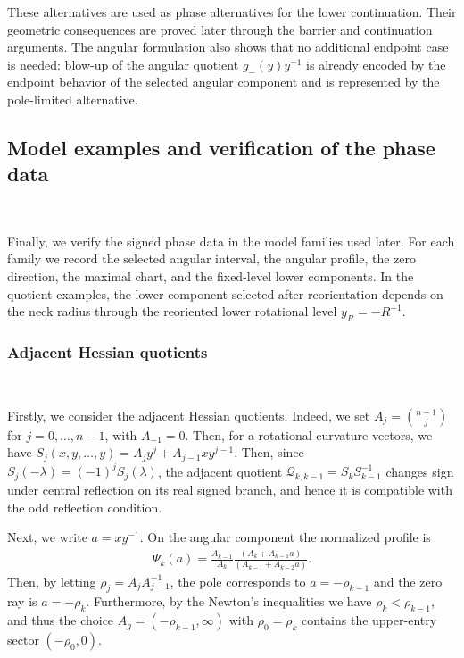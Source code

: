 \documentclass{amsart}
\theoremstyle{plain}
\theoremstyle{mainintrothm}
\theoremstyle{definition}
\begin{document}
	These alternatives are used as phase alternatives for the lower continuation.
	Their geometric consequences are proved later through the barrier and
	continuation arguments.  The angular formulation also shows that no additional
	endpoint case is needed: blow-up of the angular quotient
	$g_-(y)y^{-1}$ is already encoded by the endpoint behavior of the selected
	angular component and is represented by the pole-limited alternative.


	\subsection{Model examples and verification of the phase data}\,
	\label{subsec:model-examples-branches}

	Finally, we verify the signed phase data in the model families used later.  For each
	family we record the selected angular interval, the angular profile, the zero
	direction, the maximal chart, and the fixed-level lower components.  In the
	quotient examples, the lower component selected after reorientation depends on
	the neck radius through the reoriented lower rotational level
	$y_R=-R^{-1}$.

	\subsubsection{Adjacent Hessian quotients}\,
	\label{subsubsec:adjacent-hessian-quotients}

	Firstly, we consider the adjacent Hessian quotients. Indeed, we  set
	$A_j=\binom{n-1}{j}$ for $j=0,\ldots,n-1$, with $A_{-1}=0$. Then, for a rotational
	curvature vectors, we have $S_j(x,y,\ldots,y)=A_jy^j+A_{j-1}xy^{j-1}$.
	Then, since  $S_j(-\lambda)=(-1)^jS_j(\lambda)$, the adjacent quotient
 $\mathcal Q_{k,k-1}=S_kS_{k-1}^{-1}$ changes sign under central reflection on its real signed branch, and hence it is compatible with the odd reflection condition.

	\medskip

	Next, we write $a=xy^{-1}$.  On the angular component
	the normalized profile is
	\begin{align}
		\label{eq:adjacent-hessian-quotient-angular-profile}
		\Psi_k(a)
		=
		\frac{A_{k-1}}{A_k}
		\frac{(A_k+A_{k-1}a)}{(A_{k-1}+A_{k-2}a)}.
	\end{align}
	Then, by letting $\rho_j=A_jA_{j-1}^{-1}$, the pole corresponds to $a=-\rho_{k-1}$ and the zero ray is $a=-\rho_k$.  Furthermore, by the Newton's inequalities we have  $\rho_k<\rho_{k-1}$, and thus the choice $A_g=(-\rho_{k-1},\infty)$ with $\rho_0=\rho_k$ contains the upper-entry sector $(-\rho_0,0)$.
\end{document}
